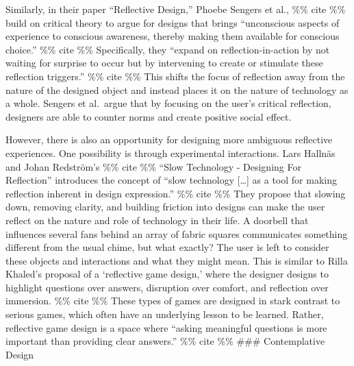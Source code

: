 \documentclass[
]{article}
\begin{document}
Similarly, in their paper ``Reflective Design,'' Phoebe Sengers et al.,
\%\% cite \%\% build on critical theory to argue for designs that brings
``unconscious aspects of experience to conscious awareness, thereby
making them available for conscious choice.'' \%\% cite \%\%
Specifically, they ``expand on reflection-in-action by not waiting for
surprise to occur but by intervening to create or stimulate these
reflection triggers.'' \%\% cite \%\% This shifts the focus of
reflection away from the nature of the designed object and instead
places it on the nature of technology as a whole. Sengers et al.~argue
that by focusing on the user's critical reflection, designers are able
to counter norms and create positive social effect.

However, there is also an opportunity for designing more ambiguous
reflective experiences. One possibility is through experimental
interactions. Lars Hallnäs and Johan Redström's \%\% cite \%\% ``Slow
Technology - Designing For Reflection'' introduces the concept of ``slow
technology {[}\ldots{]} as a tool for making reflection inherent in
design expression.'' \%\% cite \%\% They propose that slowing down,
removing clarity, and building friction into designs can make the user
reflect on the nature and role of technology in their life. A doorbell
that influences several fans behind an array of fabric squares
communicates something different from the usual chime, but what exactly?
The user is left to consider these objects and interactions and what
they might mean. This is similar to Rilla Khaled's proposal of a
`reflective game design,' where the designer designs to highlight
questions over answers, disruption over comfort, and reflection over
immersion. \%\% cite \%\% These types of games are designed in stark
contrast to serious games, which often have an underlying lesson to be
learned. Rather, reflective game design is a space where ``asking
meaningful questions is more important than providing clear answers.''
\%\% cite \%\% \#\#\# Contemplative Design
\end{document}
